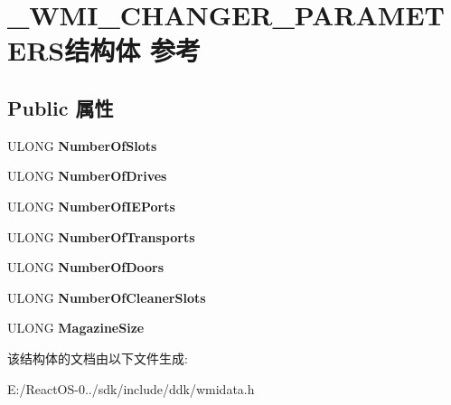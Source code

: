 \hypertarget{struct___w_m_i___c_h_a_n_g_e_r___p_a_r_a_m_e_t_e_r_s}{}\section{\+\_\+\+W\+M\+I\+\_\+\+C\+H\+A\+N\+G\+E\+R\+\_\+\+P\+A\+R\+A\+M\+E\+T\+E\+R\+S结构体 参考}
\label{struct___w_m_i___c_h_a_n_g_e_r___p_a_r_a_m_e_t_e_r_s}
\subsection*{Public 属性}
\begin{DoxyCompactItemize}
\item 
\mbox{\label{struct___w_m_i___c_h_a_n_g_e_r___p_a_r_a_m_e_t_e_r_s_a114d0ab013ad0138347c2b41561738dc}} 
U\+L\+O\+NG {\bfseries Number\+Of\+Slots}
\item 
\mbox{\label{struct___w_m_i___c_h_a_n_g_e_r___p_a_r_a_m_e_t_e_r_s_ac764ca240533567fa5351cbeb4310850}} 
U\+L\+O\+NG {\bfseries Number\+Of\+Drives}
\item 
\mbox{\label{struct___w_m_i___c_h_a_n_g_e_r___p_a_r_a_m_e_t_e_r_s_a40893043df9641b61439f4400f0af585}} 
U\+L\+O\+NG {\bfseries Number\+Of\+I\+E\+Ports}
\item 
\mbox{\label{struct___w_m_i___c_h_a_n_g_e_r___p_a_r_a_m_e_t_e_r_s_aa28a10d5269390d11f5753cfc2625b69}} 
U\+L\+O\+NG {\bfseries Number\+Of\+Transports}
\item 
\mbox{\label{struct___w_m_i___c_h_a_n_g_e_r___p_a_r_a_m_e_t_e_r_s_a5e81bc0a003c15edfb2bac031ab451dc}} 
U\+L\+O\+NG {\bfseries Number\+Of\+Doors}
\item 
\mbox{\label{struct___w_m_i___c_h_a_n_g_e_r___p_a_r_a_m_e_t_e_r_s_aebe42e9854a23a2bec9ee8b97954890c}} 
U\+L\+O\+NG {\bfseries Number\+Of\+Cleaner\+Slots}
\item 
\mbox{\label{struct___w_m_i___c_h_a_n_g_e_r___p_a_r_a_m_e_t_e_r_s_ad15812139a4e0a5d12e8a34fa2be5a80}} 
U\+L\+O\+NG {\bfseries Magazine\+Size}
\end{DoxyCompactItemize}


该结构体的文档由以下文件生成\+:\begin{DoxyCompactItemize}
\item 
E\+:/\+React\+O\+S-\/0../sdk/include/ddk/wmidata.\+h\end{DoxyCompactItemize}
